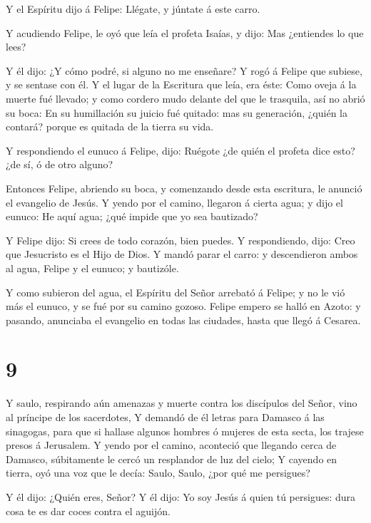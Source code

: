  Y el Espíritu dijo á Felipe: Llégate, y júntate á este
carro.

 Y acudiendo Felipe, le oyó que leía el profeta Isaías, y
dijo: Mas ¿entiendes lo que lees?

 Y él dijo: ¿Y cómo podré, si alguno no me enseñare? Y rogó
á Felipe que subiese, y se sentase con él.  Y el lugar de
la Escritura que leía, era éste: Como oveja á la muerte fué llevado; y
como cordero mudo delante del que le trasquila, así no abrió su boca:
 En su humillación su juicio fué quitado: mas su
generación, ¿quién la contará? porque es quitada de la tierra su vida.

 Y respondiendo el eunuco á Felipe, dijo: Ruégote ¿de quién
el profeta dice esto? ¿de sí, ó de otro alguno?

 Entonces Felipe, abriendo su boca, y comenzando desde esta
escritura, le anunció el evangelio de Jesús.  Y yendo por
el camino, llegaron á cierta agua; y dijo el eunuco: He aquí agua; ¿qué
impide que yo sea bautizado?

 Y Felipe dijo: Si crees de todo corazón, bien puedes. Y
respondiendo, dijo: Creo que Jesucristo es el Hijo de Dios.
 Y mandó parar el carro: y descendieron ambos al agua,
Felipe y el eunuco; y bautizóle.

 Y como subieron del agua, el Espíritu del Señor arrebató á
Felipe; y no le vió más el eunuco, y se fué por su camino gozoso.
 Felipe empero se halló en Azoto: y pasando, anunciaba el
evangelio en todas las ciudades, hasta que llegó á Cesarea.

\hypertarget{section-8}{%
\section{9}\label{section-8}}

 Y saulo, respirando aún amenazas y muerte contra los
discípulos del Señor, vino al príncipe de los sacerdotes,  Y
demandó de él letras para Damasco á las sinagogas, para que si hallase
algunos hombres ó mujeres de esta secta, los trajese presos á Jerusalem.
 Y yendo por el camino, aconteció que llegando cerca de
Damasco, súbitamente le cercó un resplandor de luz del cielo;
 Y cayendo en tierra, oyó una voz que le decía: Saulo,
Saulo, ¿por qué me persigues?

 Y él dijo: ¿Quién eres, Señor? Y él dijo: Yo soy Jesús á
quien tú persigues: dura cosa te es dar coces contra el aguijón.

